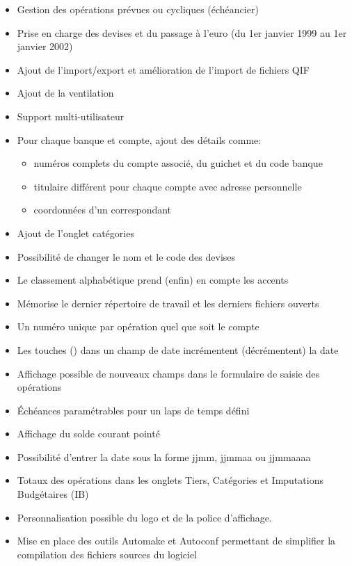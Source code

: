 \begin{itemize}
	\item Gestion des opérations prévues ou cycliques (échéancier) 
	\item Prise en charge des devises et du passage à l'euro (du 1er janvier 1999 au 1er janvier 2002)
	\item Ajout de l'import/export et amélioration de l'import de fichiers \gls{QIF}
	\item Ajout de la ventilation
	\item Support multi-utilisateur
	\item Pour chaque banque et compte, ajout des détails comme:
		\begin{itemize}
		\item numéros complets du compte associé, du guichet et du code banque
		\item titulaire différent pour chaque compte avec adresse personnelle
		\item coordonnées d'un correspondant
		\end{itemize}
	\item Ajout de l'onglet catégories
	\item Possibilité de changer le nom et le code des devises
	\item Le classement alphabétique prend (enfin) en compte les accents
	\item Mémorise le dernier répertoire de travail et les derniers fichiers ouverts
	\item Un numéro unique par opération quel que soit le compte
	\item Les touches \key{+} (\key{-}) dans un champ de date incrémentent (décrémentent)
	la date
	\item Affichage possible de nouveaux champs dans le formulaire de saisie des opérations 
	\item Échéances paramétrables pour un laps de temps défini
	\item Affichage du solde courant pointé
	\item Possibilité d'entrer la date sous la forme jjmm, jjmmaa ou jjmmaaaa
	\item Totaux des opérations dans les onglets Tiers, Catégories et Imputations Budgétaires (IB)
	\item Personnalisation possible du logo et de la police d'affichage.
	\item Mise en place des outils Automake et Autoconf permettant de simplifier la compilation des fichiers sources du logiciel
\end{itemize}

